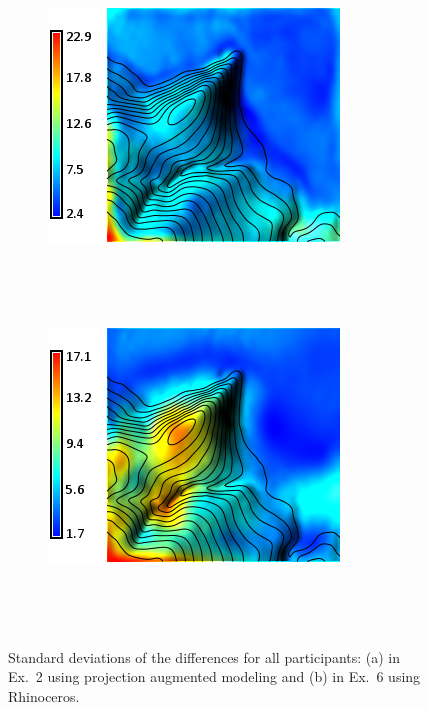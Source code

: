 \documentclass{sigchi}
\begin{document}
%
\setlength{\belowcaptionskip}{-1em}
%
\begin{figure}[h]
        \centering
        \begin{subfigure}[t]{0.225\textwidth}
                \includegraphics[width=\textwidth]{figures/series/diff_stddev_2.png}
                \caption{}~\label{fig:diff_stddev_2}
        \end{subfigure}
        ~ %
        \begin{subfigure}[t]{0.225\textwidth}
                \includegraphics[width=\textwidth]{figures/series/diff_stddev_6.png}
                \caption{}~\label{fig:diff_stddev_6}
        \end{subfigure}
        ~ %
        \caption{Standard deviations of the differences for all participants: %
        (a) in Ex.~2 using projection augmented modeling and %
        (b) in Ex.~6 using Rhinoceros. %
        }
        \label{fig:diff_stddev}
\end{figure}
%
\setlength{\belowcaptionskip}{0em}
%
\end{document}
